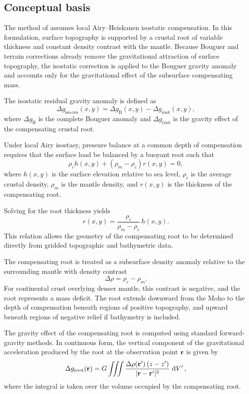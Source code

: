 \subsection{Conceptual basis}

The method of \citet{Simpson_etal1986} assumes local Airy--Heiskanen isostatic compensation. In this formulation, surface topography is supported by a crustal root of variable thickness and constant density contrast with the mantle. Because Bouguer and terrain corrections already remove the gravitational attraction of surface topography, the isostatic correction is applied to the Bouguer gravity anomaly and accounts only for the gravitational effect of the subsurface compensating mass.

The isostatic residual gravity anomaly is defined as
\[
    \Delta g_{\mathrm{iso\text{-}res}}(x,y) =
    \Delta g_{\mathrm{B}}(x,y) - \Delta g_{\mathrm{root}}(x,y),
\]
where $\Delta g_{\mathrm{B}}$ is the complete Bouguer anomaly and $\Delta g_{\mathrm{root}}$ is the gravity effect of the compensating crustal root.

Under local Airy isostasy, pressure balance at a common depth of compensation requires that the surface load be balanced by a buoyant root such that
\[
    \rho_c h(x,y) + \left( \rho_m - \rho_c \right) r(x,y) = 0,
\]
where $h(x,y)$ is the surface elevation relative to sea level, $\rho_c$ is the average crustal density, $\rho_m$ is the mantle density, and $r(x,y)$ is the thickness of the compensating root.

Solving for the root thickness yields
\[
    r(x,y)
    =
    \frac{\rho_c}{\rho_m - \rho_c}\, h(x,y).
\]
This relation allows the geometry of the compensating root to be determined directly from gridded topographic and bathymetric data.

The compensating root is treated as a subsurface density anomaly relative to the surrounding mantle with density contrast
\[
    \Delta \rho = \rho_c - \rho_m .
\]
For continental crust overlying denser mantle, this contrast is negative, and the root represents a mass deficit. The root extends downward from the Moho to the depth of compensation beneath regions of positive topography, and upward beneath regions of negative relief if bathymetry is included.

The gravity effect of the compensating root is computed using standard forward-gravity methods. In continuous form, the vertical component of the gravitational acceleration produced by the root at the observation point $\vb{r}$ is given by
\[
    \Delta g_{\mathrm{root}}(\vb{r}) =
    G \iiint
    \frac{\Delta \rho(\vb{r'}) \, (z - z')} {|\vb{r} - \vb{r'}|^3}
    \, \dd{V'} ,
\]
where the integral is taken over the volume occupied by the compensating root.

